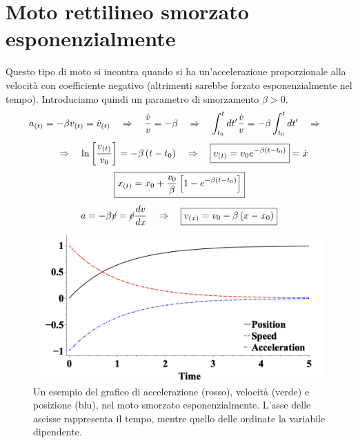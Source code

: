 \section{Moto rettilineo smorzato esponenzialmente}
\label{section:MRSE}
Questo tipo di moto si incontra quando si ha un'accelerazione proporzionale
alla velocità con coefficiente negativo (altrimenti sarebbe forzato esponenzialmente nel tempo). Introduciamo quindi un parametro di smorzamento $\beta>0$.
\begin{equation*}
    a_{(t)} = -\beta v_{(t)} = \dot v_{(t)}\quad\Rightarrow\quad \frac{\dot v}{v} =
    -\beta \quad\Rightarrow\quad \int_{t_0}^{t}dt' \frac{\dot v}{v} =  -\beta\int_{t_0}^{t}dt'\quad\Rightarrow\quad
\end{equation*}
\begin{equation}
    \quad\Rightarrow\quad\ln{\left[ \frac{v_{(t)}}{v_0}\right]} =
    -\beta\left( t-t_0\right)\quad\Rightarrow\quad \boxed{v_{(t)} = v_0e^{-\beta\left( t-t_0\right)}} = \dot x 
\end{equation}
\begin{equation}
    \boxed{x_{(t)} = x_0 + \frac{v_0}\beta\left[1-e^{-\beta\left( t-t_0\right)}\right]}
\label{eq:MRSE}
\end{equation}
\begin{equation}
    a = -\beta \cancel{v} = \cancel{v}\frac{dv}{dx}\quad\Rightarrow\quad
    \boxed{v_{(x)} = v_0 - \beta\left( x - x_0\right)}
\label{eq:v(x)_MRSE}
\end{equation}

\begin{figure}[htbp]
    \begin{center}
        \includegraphics[width=13cm]{images/MRSE.png} 
        \caption{Un esempio del grafico di accelerazione (rosso), velocità (verde)
        e posizione (blu), nel moto smorzato esponenzialmente. L'asse delle
        ascisse rappresenta il tempo, mentre quello delle ordinate
        la variabile dipendente.}
    \end{center}
\label{fig:MRSE}
\end{figure}